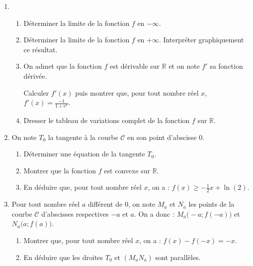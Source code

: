 \begin{enumerate}
	\item 
	\begin{enumerate}
		\item Déterminer la limite de la fonction $f$ en $-\infty$.
		\item Déterminer la limite de la fonction $f$ en $+\infty$. Interpréter graphiquement ce résultat.
		\item On admet que la fonction $f$ est dérivable sur $\mathbb{R}$ et on note $f'$ sa fonction dérivée.
		
		Calculer $f'(x)$ puis montrer que, pour tout nombre réel $x$, $f'(x)=\frac{-1}{1+\text{e}^{x}}$.
		\item Dresser le tableau de variations complet de la fonction $f$ sur $\mathbb{R}$.
	\end{enumerate}
	\item On note $T_0$ la tangente à la courbe $\mathcal{C}$ en son point d’abscisse 0.
	\begin{enumerate}
		\item Déterminer une équation de la tangente $T_0$.
		\item Montrer que la fonction $f$ est convexe sur $\mathbb{R}$.
		\item En déduire que, pour tout nombre réel $x$, on a : $f(x) \geqslant -\frac12 x + \ln(2)$.
	\end{enumerate}
	\item Pour tout nombre réel $a$ différent de 0, on note $M_a$ et $N_a$ les points de la courbe $\mathcal{C}$ d’abscisses respectives $-a$ et $a$. On a donc : $M_a \big(-a;f(-a)\big)$ et $N_a \big(a;f(a)\big)$.
	\begin{enumerate}
		\item Montrer que, pour tout nombre réel $x$, on a : $f(x)-f(-x)=-x$.
		\item En déduire que les droites $T_0$ et $(M_aN_a)$ sont parallèles. 
	\end{enumerate}
\end{enumerate}